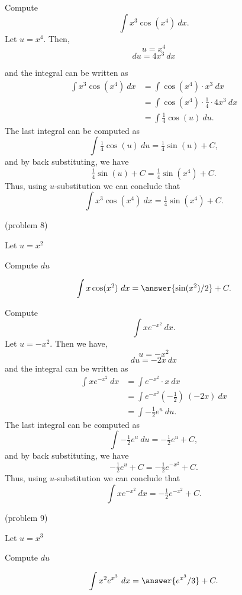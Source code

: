 \documentclass[handout]{ximera}
\begin{document}
\begin{example}[example 8] Compute 
\[\int x^3\cos(x^4) \ dx.\]
Let $u = x^4$.  Then,
\[u = x^4\]
\[du = 4x^3 \ dx\]

and the integral can be written as 
\begin{align*}
\int x^3\cos(x^4) \ dx &= \int \cos(x^4) \cdot x^3\  dx \\
&=  \int \cos(x^4)\cdot \tfrac14 \cdot 4x^3\  dx\\
&=  \int \tfrac14\cos(u) \ du.
\end{align*}
The last integral can be computed as 
\[\int \tfrac14 \cos(u) \ du = \tfrac14 \sin(u) + C,\]
and by back substituting, we have 
\[\tfrac14 \sin(u) + C = \tfrac14 \sin(x^4) + C.\]
Thus, using $u$-substitution we can conclude that
\[\int x^3\cos(x^4) \ dx =  \tfrac14 \sin(x^4) + C.\]
\end{example}

\begin{problem}(problem 8)
\begin{hint}
Let $u = x^2$
\end{hint}
\begin{hint}
Compute $du$
\end{hint}
\[\int x\cos(x^2) \ dx = \answer{\sin(x^2)/2} +C.\]
\end{problem}


\begin{example}[example 9] Compute 
\[\int xe^{-x^2} \ dx.\]
Let $u = -x^2 $.  Then we have,
\[u = -x^2\]
\[du = -2x \ dx\]
and the integral can be written as
\begin{align*}
\int xe^{-x^2} \ dx &= \int e^{-x^2} \cdot x\  dx \\
&=  \int e^{-x^2}( -\tfrac12)\ (-2x)\  dx \\
&=  \int -\tfrac12 e^u \ du.
\end{align*}
The last integral can be computed as 
\[ \int -\tfrac12 e^u \ du = -\tfrac12 e^u + C,\]
and by back substituting, we have 
\[-\tfrac12 e^u + C = -\tfrac12 e^{-x^2} + C.\]
Thus, using $u$-substitution we can conclude that
\[\int xe^{-x^2} \ dx =  -\tfrac12 e^{-x^2} + C.\]
\end{example}


\begin{problem}(problem 9)
\begin{hint}
Let $u = x^3$
\end{hint}
\begin{hint}
Compute $du$
\end{hint}
\[\int x^2e^{x^3} \ dx = \answer{e^{x^3}/3} +C.\]
\end{problem}
\end{document}
